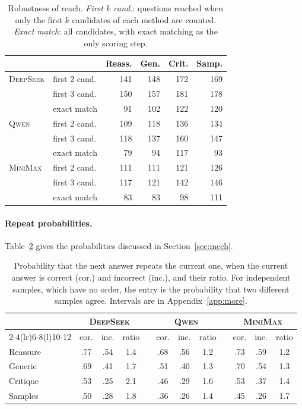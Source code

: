 \documentclass[11pt]{article}
\newcommand{\ds}{\textsc{DeepSeek}}
\newcommand{\qw}{\textsc{Qwen}}
\newcommand{\mm}{\textsc{MiniMax}}
\begin{document}
\begin{table}[h]
\centering
\small
\setlength{\tabcolsep}{4pt}
\begin{tabular}{@{}ll rrrr@{}}
\toprule
 & & Reass. & Gen. & Crit. & Samp. \\
\midrule
\ds & first 2 cand. & 141 & 148 & 172 & 169 \\
 & first 3 cand. & 150 & 157 & 181 & 178 \\
 & exact match & 91 & 102 & 122 & 120 \\
\qw & first 2 cand. & 109 & 118 & 136 & 134 \\
 & first 3 cand. & 118 & 137 & 160 & 147 \\
 & exact match & 79 & 94 & 117 & 93 \\
\mm & first 2 cand. & 111 & 111 & 121 & 126 \\
 & first 3 cand. & 117 & 121 & 142 & 146 \\
 & exact match & 83 & 83 & 98 & 111 \\
\bottomrule
\end{tabular}
\caption{Robustness of reach. \emph{First $k$ cand.}: questions reached when only the first $k$ candidates of each method are counted. \emph{Exact match}: all candidates, with exact matching as the only scoring step.}
\label{tab:robust}
\end{table}

\paragraph{Repeat probabilities.}
Table~\ref{tab:stay} gives the probabilities discussed in Section~\ref{sec:mech}.

\begin{table}[h]
\centering
\small
\setlength{\tabcolsep}{2.1pt}
\begin{tabular}{@{}l ccc c ccc c ccc@{}}
\toprule
 & \multicolumn{3}{c}{\ds} & & \multicolumn{3}{c}{\qw} & & \multicolumn{3}{c}{\mm} \\
\cmidrule(lr){2-4}\cmidrule(lr){6-8}\cmidrule(l){10-12}
 & cor. & inc. & ratio & & cor. & inc. & ratio & & cor. & inc. & ratio \\
\midrule
Reassure & .77 & .54 & 1.4 & & .68 & .56 & 1.2 & & .73 & .59 & 1.2 \\
Generic & .69 & .41 & 1.7 & & .51 & .40 & 1.3 & & .70 & .54 & 1.3 \\
Critique & .53 & .25 & 2.1 & & .46 & .29 & 1.6 & & .53 & .37 & 1.4 \\
Samples & .50 & .28 & 1.8 & & .36 & .26 & 1.4 & & .45 & .26 & 1.7 \\
\bottomrule
\end{tabular}
\caption{Probability that the next answer repeats the current one, when the current answer is correct (cor.) and incorrect (inc.), and their ratio. For independent samples, which have no order, the entry is the probability that two different samples agree. Intervals are in Appendix~\ref{app:more}.}
\label{tab:stay}
\end{table}
\end{document}
